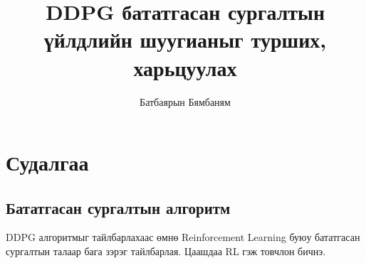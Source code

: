 \documentclass[12pt,A4]{report}
\begin{document}

\title{DDPG бататгасан сургалтын үйлдлийн шуугианыг турших, харьцуулах }
\author{Батбаярын Бямбаням}
\cosupervisor{}








\chapter{Судалгаа}

\section{Бататгасан сургалтын алгоритм}

DDPG алгоритмыг тайлбарлахаас өмнө Reinforcement Learning буюу бататгасан сургалтын талаар бага зэрэг тайлбарлая. Цаашдаа RL гэж товчлон бичнэ.
\end{document}
